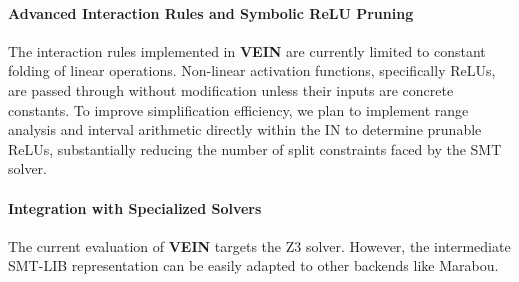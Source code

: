 \paragraph{Advanced Interaction Rules and Symbolic ReLU Pruning}
The interaction rules implemented in \textbf{VEIN} are currently limited to constant folding of linear
operations. Non-linear activation functions, specifically ReLUs, are passed through without
modification unless their inputs are concrete constants. To improve simplification efficiency, we
plan to implement range analysis and interval arithmetic directly within the IN to determine prunable
ReLUs, substantially reducing the number of split constraints faced by the SMT solver.

\paragraph{Integration with Specialized Solvers}
The current evaluation of \textbf{VEIN} targets the Z3 solver. However, the intermediate SMT-LIB
representation can be easily adapted to other backends like Marabou.
